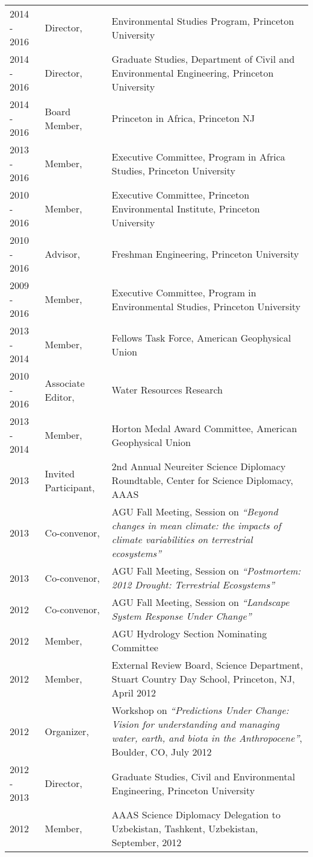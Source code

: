 \documentclass[10pt]{report}
\begin{document}
\begin{longtable}{p{.75in} p{1.1in} p{4.2in}}
2014 - 2016 & Director, & Environmental Studies Program, Princeton University \\
2014 - 2016 & Director, & Graduate Studies, Department of Civil and Environmental Engineering, Princeton University \\
2014 - 2016 & Board Member, & Princeton in Africa, Princeton NJ \\
2013 - 2016 & Member, & Executive Committee, Program in Africa Studies, Princeton University \\
2010 - 2016 & Member, & Executive Committee, Princeton Environmental Institute, Princeton University \\
2010 - 2016 & Advisor, & Freshman Engineering, Princeton University \\ 
2009 - 2016 & Member, &  Executive Committee, Program in Environmental Studies, Princeton University \\
2013 - 2014 & Member, & Fellows Task Force, American Geophysical Union \\ 
2010 - 2016 & Associate Editor, & Water Resources Research \\ 
2013 - 2014 & Member, & Horton Medal Award Committee, American Geophysical Union \\ 
2013 & Invited Participant, & 2nd Annual Neureiter Science Diplomacy Roundtable, Center for Science Diplomacy, AAAS \\
2013 & Co-convenor, & AGU Fall Meeting, Session on \emph{``Beyond changes in mean climate: the impacts of climate variabilities on terrestrial ecosystems''}\\
2013 & Co-convenor, & AGU Fall Meeting, Session on \emph{``Postmortem: 2012 Drought: Terrestrial Ecosystems''}\\
2012 & Co-convenor, & AGU Fall Meeting, Session on \emph{``Landscape System Response Under Change''} \\
2012 & Member, & AGU Hydrology Section Nominating Committee \\ 
2012 & Member, & External Review Board, Science Department, Stuart Country Day School, Princeton, NJ, April 2012 \\ 
2012 & Organizer, & Workshop on \emph{``Predictions Under Change: Vision for understanding and managing water, earth, and biota in the Anthropocene''}, Boulder, CO, July 2012 \\ 
2012 - 2013 & Director, & Graduate Studies, Civil and Environmental Engineering, Princeton University \\ 
2012 & Member, & AAAS Science Diplomacy Delegation to Uzbekistan, Tashkent, Uzbekistan, September, 2012 \\ 

\end{longtable}
\end{document}
